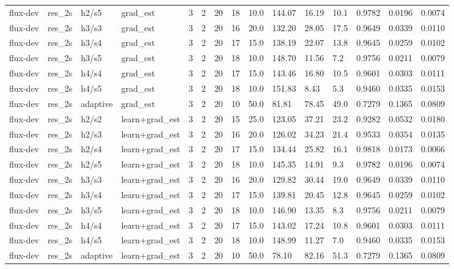 \begin{tabular}{llllllrrlllllll}
flux-dev & res_2s & h2/s5 & grad_est & 3 & 2 & 20 & 18 & 10.0 & 144.07 & 16.19 & 10.1 & 0.9782 & 0.0196 & 0.0074 \\
flux-dev & res_2s & h3/s3 & grad_est & 3 & 2 & 20 & 16 & 20.0 & 132.20 & 28.05 & 17.5 & 0.9649 & 0.0339 & 0.0110 \\
flux-dev & res_2s & h3/s4 & grad_est & 3 & 2 & 20 & 17 & 15.0 & 138.19 & 22.07 & 13.8 & 0.9645 & 0.0259 & 0.0102 \\
flux-dev & res_2s & h3/s5 & grad_est & 3 & 2 & 20 & 18 & 10.0 & 148.70 & 11.56 & 7.2 & 0.9756 & 0.0211 & 0.0079 \\
flux-dev & res_2s & h4/s4 & grad_est & 3 & 2 & 20 & 17 & 15.0 & 143.46 & 16.80 & 10.5 & 0.9601 & 0.0303 & 0.0111 \\
flux-dev & res_2s & h4/s5 & grad_est & 3 & 2 & 20 & 18 & 10.0 & 151.83 & 8.43 & 5.3 & 0.9460 & 0.0335 & 0.0153 \\
flux-dev & res_2s & adaptive & grad_est & 3 & 2 & 20 & 10 & 50.0 & 81.81 & 78.45 & 49.0 & 0.7279 & 0.1365 & 0.0809 \\
flux-dev & res_2s & h2/s2 & learn+grad_est & 3 & 2 & 20 & 15 & 25.0 & 123.05 & 37.21 & 23.2 & 0.9282 & 0.0532 & 0.0180 \\
flux-dev & res_2s & h2/s3 & learn+grad_est & 3 & 2 & 20 & 16 & 20.0 & 126.02 & 34.23 & 21.4 & 0.9533 & 0.0354 & 0.0135 \\
flux-dev & res_2s & h2/s4 & learn+grad_est & 3 & 2 & 20 & 17 & 15.0 & 134.44 & 25.82 & 16.1 & 0.9818 & 0.0173 & 0.0066 \\
flux-dev & res_2s & h2/s5 & learn+grad_est & 3 & 2 & 20 & 18 & 10.0 & 145.35 & 14.91 & 9.3 & 0.9782 & 0.0196 & 0.0074 \\
flux-dev & res_2s & h3/s3 & learn+grad_est & 3 & 2 & 20 & 16 & 20.0 & 129.82 & 30.44 & 19.0 & 0.9649 & 0.0339 & 0.0110 \\
flux-dev & res_2s & h3/s4 & learn+grad_est & 3 & 2 & 20 & 17 & 15.0 & 139.81 & 20.45 & 12.8 & 0.9645 & 0.0259 & 0.0102 \\
flux-dev & res_2s & h3/s5 & learn+grad_est & 3 & 2 & 20 & 18 & 10.0 & 146.90 & 13.35 & 8.3 & 0.9756 & 0.0211 & 0.0079 \\
flux-dev & res_2s & h4/s4 & learn+grad_est & 3 & 2 & 20 & 17 & 15.0 & 143.02 & 17.24 & 10.8 & 0.9601 & 0.0303 & 0.0111 \\
flux-dev & res_2s & h4/s5 & learn+grad_est & 3 & 2 & 20 & 18 & 10.0 & 148.99 & 11.27 & 7.0 & 0.9460 & 0.0335 & 0.0153 \\
flux-dev & res_2s & adaptive & learn+grad_est & 3 & 2 & 20 & 10 & 50.0 & 78.10 & 82.16 & 51.3 & 0.7279 & 0.1365 & 0.0809 \\

\end{tabular}
